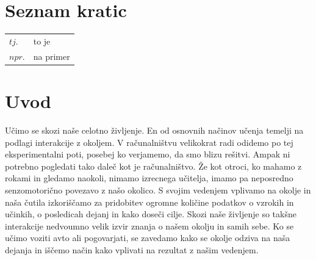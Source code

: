 \documentclass[a4paper, oneside, 12pt]{report}
\newcommand\nomenclature[2]{#1 & #2 \\}
\begin{document}
\tableofcontents
\thispagestyle{fancy}
\newpage

\listoftables
\thispagestyle{fancy}
\newpage

\listoffigures
\thispagestyle{fancy}
\newpage


\chapter*{Seznam kratic}
\thispagestyle{fancy}
\begin{longtable}{@{}p{1cm}@{}p{\dimexpr\textwidth-1cm\relax}@{}}
\nomenclature{$tj.$}{to je}
\nomenclature{$npr.$}{na primer}
\end{longtable}
\newpage


\chapter{Uvod}
\thispagestyle{fancy}
Učimo se skozi naše celotno življenje. En od osnovnih načinov učenja temelji na podlagi interakcije z okoljem. V računalništvu velikokrat radi odidemo po tej eksperimentalni poti, posebej ko verjamemo, da smo blizu rešitvi. Ampak ni potrebno pogledati tako daleč kot je računalništvo. Že kot otroci, ko mahamo z rokami in gledamo naokoli, nimamo izrecnega učitelja, imamo pa neposredno senzomotorično povezavo z našo okolico. S svojim vedenjem vplivamo na okolje in naša čutila izkoriščamo za pridobitev ogromne količine podatkov o vzrokih in učinkih, o posledicah dejanj in kako doseči cilje. Skozi naše življenje so takšne interakcije nedvoumno velik izvir znanja o našem okolju in samih sebe. Ko se učimo voziti avto ali pogovarjati, se zavedamo kako se okolje odziva na naša dejanja in iščemo način kako vplivati na rezultat z našim vedenjem.
\end{document}
